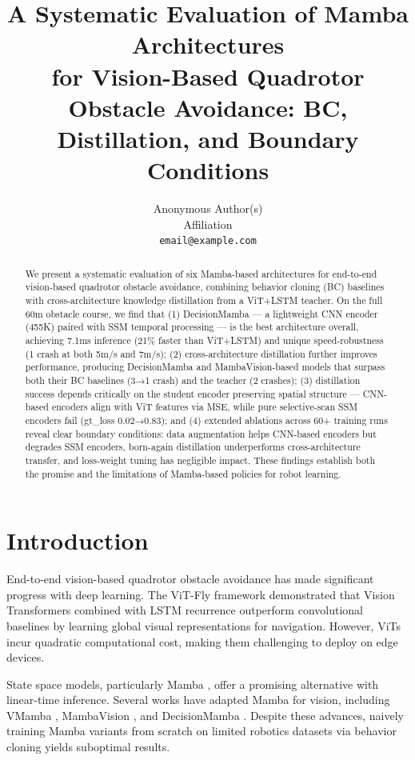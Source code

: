 \documentclass{article}
\title{A Systematic Evaluation of Mamba Architectures\\for Vision-Based Quadrotor Obstacle Avoidance:
BC, Distillation, and Boundary Conditions}
\author{
  Anonymous Author(s) \\
  Affiliation \\
  \texttt{email@example.com} \\
}
\begin{document}
\maketitle

\begin{abstract}
We present a systematic evaluation of six Mamba-based architectures for end-to-end vision-based quadrotor obstacle avoidance, combining behavior cloning (BC) baselines with cross-architecture knowledge distillation from a ViT+LSTM teacher. On the full 60m obstacle course, we find that (1) DecisionMamba --- a lightweight CNN encoder (455K) paired with SSM temporal processing --- is the best architecture overall, achieving 7.1ms inference (21\% faster than ViT+LSTM) and unique speed-robustness (1 crash at both 5m/s and 7m/s); (2) cross-architecture distillation further improves performance, producing DecisionMamba and MambaVision-based models that surpass both their BC baselines (3→1 crash) and the teacher (2 crashes); (3) distillation success depends critically on the student encoder preserving spatial structure --- CNN-based encoders align with ViT features via MSE, while pure selective-scan SSM encoders fail (gt\_loss 0.02→0.83); and (4) extended ablations across 60+ training runs reveal clear boundary conditions: data augmentation helps CNN-based encoders but degrades SSM encoders, born-again distillation underperforms cross-architecture transfer, and loss-weight tuning has negligible impact. These findings establish both the promise and the limitations of Mamba-based policies for robot learning.
\end{abstract}

\section{Introduction}

End-to-end vision-based quadrotor obstacle avoidance has made significant progress with deep learning. The ViT-Fly framework \cite{bhattacharya2024vitfly} demonstrated that Vision Transformers combined with LSTM recurrence outperform convolutional baselines by learning global visual representations for navigation. However, ViTs incur quadratic computational cost, making them challenging to deploy on edge devices.

State space models, particularly Mamba \cite{gu2023mamba}, offer a promising alternative with linear-time inference. Several works have adapted Mamba for vision, including VMamba \cite{liu2024vmamba}, MambaVision \cite{hatamizadeh2024mambavision}, and DecisionMamba \cite{chen2024decisionmamba}. Despite these advances, naively training Mamba variants from scratch on limited robotics datasets via behavior cloning yields suboptimal results.
\end{document}
